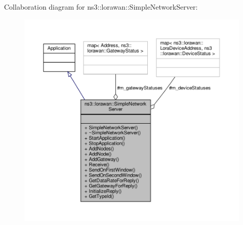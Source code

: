 Collaboration diagram for ns3\+:\+:lorawan\+:\+:Simple\+Network\+Server\+:
\nopagebreak
\begin{figure}[H]
\begin{center}
\leavevmode
\includegraphics[width=350pt]{classns3_1_1lorawan_1_1SimpleNetworkServer__coll__graph}
\end{center}
\end{figure}
